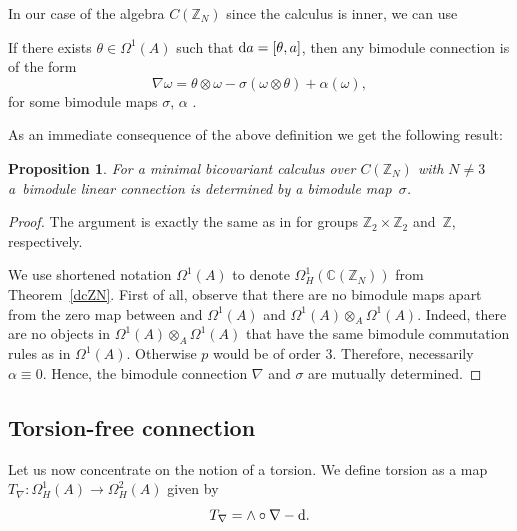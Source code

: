 \documentclass[pdftex]{sigma}
\numberwithin{equation}{section}
\newtheorem{Proposition}[Theorem]{Proposition}
 { \theoremstyle{definition}
\newtheorem{Definition}[Theorem]{Definition}
\newtheorem{Example}[Theorem]{Example}
\newtheorem{Remark}[Theorem]{Remark} }
\newcommand{\Z}{\mathbb{Z}}
\newcommand{\C}{\mathbb{C}}
\begin{document}
In our case of the algebra $C(\Z_N)$ since the calculus is inner, we can use
\begin{Remark}
If there exists $\theta\in \Omega^1(A)$ such that ${\rm d}a=[\theta, a]$, then any bimodule connection is of the form
\begin{equation}
\nabla\omega=\theta\otimes\omega-\sigma(\omega\otimes\theta)+\alpha(\omega),
\label{inner_connection}
\end{equation}
for some bimodule maps $\sigma$, $\alpha$ \cite[Theorem~2.1]{M13}.
\end{Remark}
As an immediate consequence of the above definition we get the following result:
\begin{Proposition}\label{connection_determined}
For a minimal bicovariant calculus over $C(\Z_N)$ with $N\neq 3$ a~bimodule linear connection is determined by a bimodule map~$\sigma$.
\end{Proposition}
\begin{proof}

The argument is exactly the same as in \cite{M1,M2} for groups $\mathbb{Z}_2\times\mathbb{Z}_2$ and~$\mathbb{Z}$, respectively.

We use shortened notation $\Omega^1(A)$ to denote $\Omega^1_H(\C(\Z_N))$ from Theorem~\ref{dcZN}.
First of all, observe that there are no bimodule maps apart from the zero map between
and $\Omega^1(A)$ and $\Omega^1(A) \otimes_A \Omega^1(A)$. Indeed, there are no objects in
$\Omega^1(A) \otimes_A \Omega^1(A)$ that have the same bimodule commutation rules as in
$\Omega^1(A)$. Otherwise $p$ would be of order $3$.
Therefore, necessarily $\alpha\equiv0$. Hence, the bimodule connection $\nabla$ and $\sigma$ are mutually determined.
\end{proof}
\subsection{Torsion-free connection}

Let us now concentrate on the notion of a torsion. We define torsion as a map $T_\nabla\colon \Omega^1_H(A)\rightarrow \Omega^2_H(A)$
given by
\begin{equation*}
T_\nabla=\wedge \circ \nabla-{\rm d}.
\end{equation*}
\end{document}
